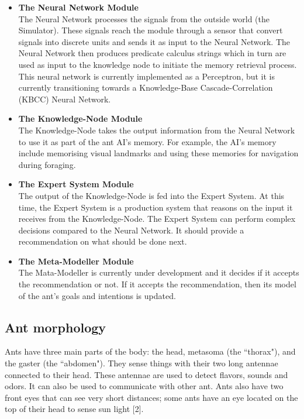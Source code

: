 \documentclass[titlepage, 12pt]{article}
\begin{document}
\begin{itemize}
\item {\bf The Neural Network Module} \\
The Neural Network processes the signals from the outside world (the Simulator). These signals reach the module through a sensor that convert signals into discrete units and sends it as input to the Neural Network. The Neural Network then produces predicate calculus strings which in turn are used as input to the knowledge node to initiate the memory retrieval process. This neural network is currently implemented as a Perceptron, but it is currently transitioning towards a Knowledge-Base Cascade-Correlation (KBCC) Neural Network. 

\item {\bf The Knowledge-Node Module} \\
The Knowledge-Node takes the output information from the Neural Network to use it as part of the ant AI's memory. For example, the AI's memory include memorising visual landmarks and using these memories for navigation during foraging.  

\item {\bf The Expert System Module} \\
The output of the Knowledge-Node is fed into the Expert System. At this time, the Expert System is a production system that reasons on the input it receives from the Knowledge-Node. The Expert System can perform complex decisions compared to the Neural Network. It should provide a recommendation on what should be done next. 

\item {\bf The Meta-Modeller Module} \\
The Mata-Modeller is currently under development and it decides if it accepts the recommendation or not. If it accepts the recommendation, then its model of the ant's goals and intentions is updated. 
\end{itemize}


\subsection{Ant morphology}
Ants have three main parts of the body: the head, metasoma (the ``thorax"), and the gaster (the ``abdomen").  They sense things with their two long antennae connected to their head. These antennae are used to detect flavors, sounds and odors.  It can also be used to communicate with other ant. Ants also have two front eyes that can see very short distances; some ants have an eye located on the top of their head to sense sun light [2]. \\
\end{document}
